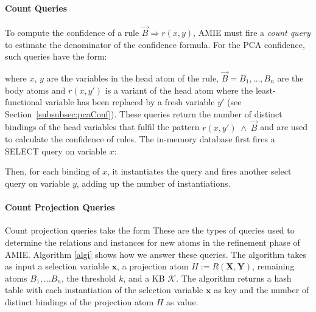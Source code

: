 \paragraph{Count Queries} To compute the confidence of a rule $\vec{B} \Rightarrow r(x, y)$, AMIE must fire a \emph{count query} to estimate the denominator
of the confidence formula. For the PCA confidence, such queries have the form:


\noindent where $x$, $y$ are the variables in the head atom of the rule, $\vec{B} = B_1, \dots, B_n$ are the body atoms and $r(x,y')$ 
is a variant of the head atom where the least-functional variable has been replaced by a fresh variable $y'$ (see Section~\ref{subsubsec:pcaConf}).
These queries return the number of distinct bindings of the head variables 
that fulfil the pattern $r(x, y')\; \wedge\; \vec{B}$ and are used to
calculate the confidence of rules. The in-memory database first fires a SELECT query on variable $x$: 


\noindent Then, for each binding of $x$, it instantiates the query and fires another select query on variable $y$, adding up the number of instantiations.


\paragraph{Count Projection Queries} Count projection queries
take the form
These are the types of queries used to determine the relations and instances for new atoms in the refinement
phase of AMIE. Algorithm \ref{algi} shows how we answer these queries. The algorithm takes as input a selection variable $\bm{x}$, a projection atom $H:=R(\bm{X},\bm{Y})$, remaining atoms $B_1, ... B_n$, the threshold $k$, 
and a KB $\mathcal{K}$. 
The algorithm returns a hash table with each instantiation of the selection variable 
$\bm{x}$ as key and the number of distinct bindings of the projection atom $H$ as value. 

